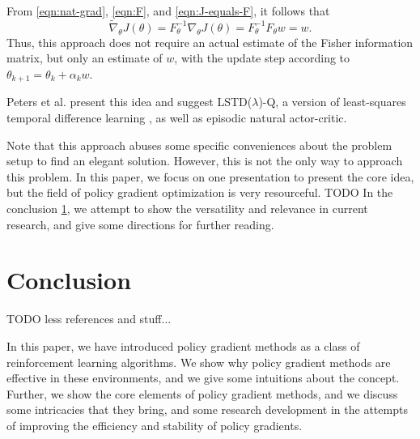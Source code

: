 From \eqref{eqn:nat-grad}, \eqref{eqn:F}, and \eqref{eqn:J-equals-F}, it follows that
\begin{equation}
  \widetilde{\nabla}_\theta J(\theta) = F^{-1}_\theta \nabla_\theta J(\theta) = F_\theta^{-1} F_\theta w = w.
\end{equation}
Thus, this approach does not require an actual estimate of the Fisher information matrix, but only an estimate of $w$, with the update step according to $\theta_{k+1} = \theta_k + \alpha_k w$.

Peters et al. \cite{4863} present this idea and suggest LSTD($\lambda$)-Q, a version of least-squares temporal difference learning  \cite{Boyan:1999:LTD:645528.657618}, as well as episodic natural actor-critic.

Note that this approach abuses some specific conveniences about the problem setup to find an elegant solution.
However, this is not the only way to approach this problem. 
In this paper, we focus on one presentation to present the core idea, but the field of policy gradient optimization is very resourceful. 
TODO 
In the conclusion \ref{sec:outro}, we attempt to show the versatility and relevance in current research, and give some directions for further reading.

\section{Conclusion}
\label{sec:outro}

TODO less references and stuff...

In this paper, we have introduced policy gradient methods as a class of reinforcement learning algorithms. 
We show why policy gradient methods are effective in these environments, and we give some intuitions about the concept. 
Further, we show the core elements of policy gradient methods, and we discuss some intricacies that they bring, and some research development in the attempts of improving the efficiency and stability of policy gradients.

